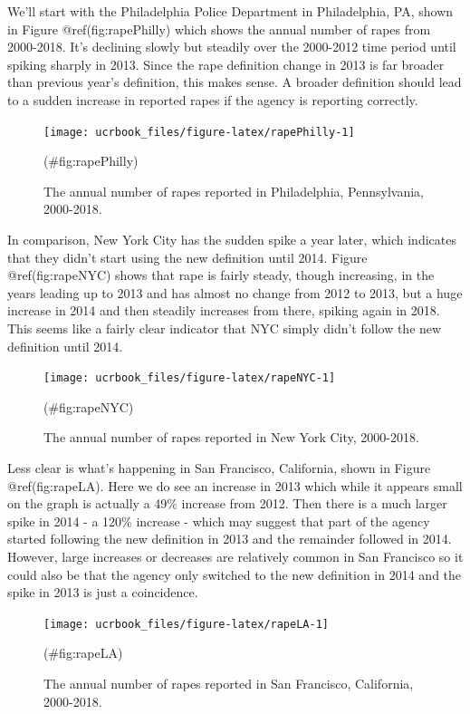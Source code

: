 \documentclass[
  12pt,
  openany]{book}
\begin{document}
We'll start with the Philadelphia Police Department in Philadelphia, PA, shown in Figure @ref(fig:rapePhilly) which shows the annual number of rapes from 2000-2018. It's declining slowly but steadily over the 2000-2012 time period until spiking sharply in 2013. Since the rape definition change in 2013 is far broader than previous year's definition, this makes sense. A broader definition should lead to a sudden increase in reported rapes if the agency is reporting correctly.

\begin{figure}

{\centering \texttt{[image: ucrbook\_files/figure-latex/rapePhilly-1]} 

}

\caption{The annual number of rapes reported in Philadelphia, Pennsylvania, 2000-2018.}(\#fig:rapePhilly)
\end{figure}

In comparison, New York City has the sudden spike a year later, which indicates that they didn't start using the new definition until 2014. Figure @ref(fig:rapeNYC) shows that rape is fairly steady, though increasing, in the years leading up to 2013 and has almost no change from 2012 to 2013, but a huge increase in 2014 and then steadily increases from there, spiking again in 2018. This seems like a fairly clear indicator that NYC simply didn't follow the new definition until 2014.

\begin{figure}

{\centering \texttt{[image: ucrbook\_files/figure-latex/rapeNYC-1]} 

}

\caption{The annual number of rapes reported in New York City, 2000-2018.}(\#fig:rapeNYC)
\end{figure}

Less clear is what's happening in San Francisco, California, shown in Figure @ref(fig:rapeLA).
Here we do see an increase in 2013 which while it appears small on the graph is actually a 49\% increase from 2012. Then there is a much larger spike in 2014 - a 120\% increase - which may suggest that part of the agency started following the new definition in 2013 and the remainder followed in 2014. However, large increases or decreases are relatively common in San Francisco so it could also be that the agency only switched to the new definition in 2014 and the spike in 2013 is just a coincidence.

\begin{figure}

{\centering \texttt{[image: ucrbook\_files/figure-latex/rapeLA-1]} 

}

\caption{The annual number of rapes reported in San Francisco, California, 2000-2018.}(\#fig:rapeLA)
\end{figure}
\end{document}
